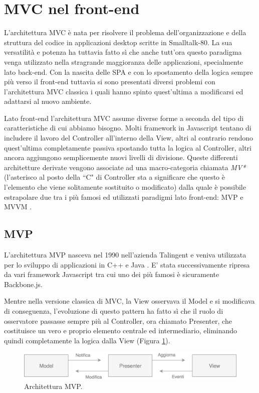 \section{MVC nel front-end}
L'architettura MVC è nata per risolvere il problema dell'organizzazione e della struttura del codice in applicazioni desktop scritte in Smalltalk-80. La sua versatilità e potenza ha tuttavia fatto sì che anche tutt'ora questo paradigma venga utilizzato nella stragrande maggioranza delle applicazioni, specialmente lato back-end.
Con la nascita delle SPA e con lo spostamento della logica sempre più verso il front-end tuttavia si sono presentati diversi problemi con l'architettura MVC classica i quali hanno spinto quest'ultima a modificarsi ed adattarsi al nuovo ambiente.

Lato front-end l'architettura MVC assume diverse forme a seconda del tipo di caratteristiche di cui abbiamo bisogno. Molti framework in Javascript tentano di includere il lavoro del Controller all'interno della View, altri al contrario rendono quest'ultima completamente passiva spostando tutta la logica al Controller, altri ancora aggiungono semplicemente nuovi livelli di divisione. Queste differenti architetture derivate vengono associate ad una macro-categoria chiamata \textit{MV*} (l'asterisco al posto della “C" di Controller sta a significare che questo è l'elemento che viene solitamente sostituito o modificato) dalla quale è possibile estrapolare due tra i più famosi ed utilizzati paradigmi lato front-end: MVP e MVVM \cite{OsmaniOnJSFrameworks}.

\subsection{MVP}
\label{ThesisMVPSection}
L'architettura MVP nasceva nel 1990 nell'azienda Talingent e veniva utilizzata per lo sviluppo di applicazioni in C++ e Java \cite{Potel1996mvp}. E' stata successivamente ripresa da vari framework Javascript tra cui uno dei più famosi è sicuramente Backbone.js.

\noindent
Mentre nella versione classica di MVC, la View osservava il Model e si modificava di conseguenza, l'evoluzione di questo pattern ha fatto sì che il ruolo di osservatore passasse sempre più al Controller, ora chiamato Presenter, che costituisce un vero e proprio elemento centrale ed intermediario, eliminando quindi completamente la logica dalla View (Figura \ref{MVPworkflow}).

\begin{figure}[h]
\centering 
\vspace*{0.5cm}
\includegraphics[width=13cm]{./images/MVPworkflow}
\caption{Architettura MVP.}
\label{MVPworkflow}
\vspace*{0.5cm} 
\end{figure}

